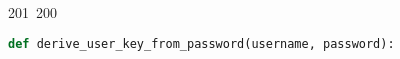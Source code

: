 201~200~\documentclass{article}
\begin{document}
	                                                                                                                                                                                                                                                                                                	                                                                                                                                        	    	                                                                                                	                                                                                                                                                                                                                                                                                                                                	                                                                        	                                                                        	                                                                                                        \begin{lstlisting}[language=Python, caption=Hashing and Verifying Passwords with Argon2]
	                                                                                                                                                                                                                                                                                                	                                                                                                                                        	    	                                                                                                	                                                                                                                                                                                                                                                                                                                                	                                                                        	                                                                        	                                                                                                        def derive_user_key_from_password(username, password):

\end{lstlisting}
\end{document}
